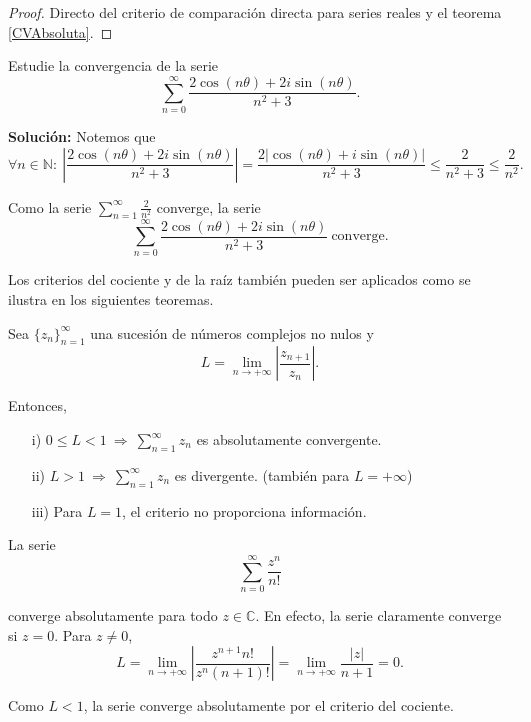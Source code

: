 \begin{proof}
Directo del criterio de comparación directa para series reales y el teorema \ref{CVAbsoluta}.
\end{proof}

\begin{ejemplo}
Estudie la convergencia de la serie
$$\sum_{n=0}^{\infty} \frac{2\cos(n\theta) + 2i \sin(n\theta)}{n^2+3}.$$

\textbf{Solución:} Notemos que
$$\forall n \in \mathbb{N}: ~ \left| \frac{2\cos(n\theta) + 2i \sin(n\theta)}{n^2+3} \right| = \frac{2|\cos(n\theta) + i \sin(n\theta)|}{n^2+3} \leq \frac{2}{n^2+3} \leq \frac{2}{n^2}.$$

Como la serie $\sum\limits_{n=1}^{\infty} \frac{2}{n^2}$ converge, la serie
$$\sum_{n=0}^{\infty} \frac{2\cos(n\theta) + 2i \sin(n\theta)}{n^2+3} ~ \mbox{converge}.$$
\end{ejemplo}

Los criterios del cociente y de la raíz también pueden ser aplicados como se ilustra en los siguientes teoremas.

\begin{teorema}
Sea $\{z_n\}_{n=1}^{\infty}$ una sucesión de números complejos no nulos y 
$$L = \lim_{n \to + \infty} \left|\frac{z_{n+1}}{z_n} \right|.$$

Entonces,
\begin{itemize}
\item[i)] $0\leq L < 1 ~\Rightarrow~ \sum\limits_{n=1}^{\infty} z_n$ es absolutamente convergente.

\item[ii)] $L > 1 ~\Rightarrow~ \sum\limits_{n=1}^{\infty} z_n $ es divergente. \qquad (también para $L = + \infty$)

\item[iii)] Para $L = 1$, el criterio no proporciona información.
\end{itemize} 
\end{teorema}

\begin{ejemplo}
La serie
$$\sum_{n=0}^{\infty} \frac{z^n}{n!}$$

converge absolutamente para todo $z \in \mathbb{C}$. En efecto, la serie claramente converge si $z = 0$. Para $z \neq 0$,
$$L = \lim_{n\to + \infty} \left| \frac{z^{n+1}n!}{z^n (n+1)!} \right| = \lim_{n\to + \infty} \frac{|z|}{n+1} = 0.$$

Como $L < 1$, la serie converge absolutamente por el criterio del cociente.
\end{ejemplo}

